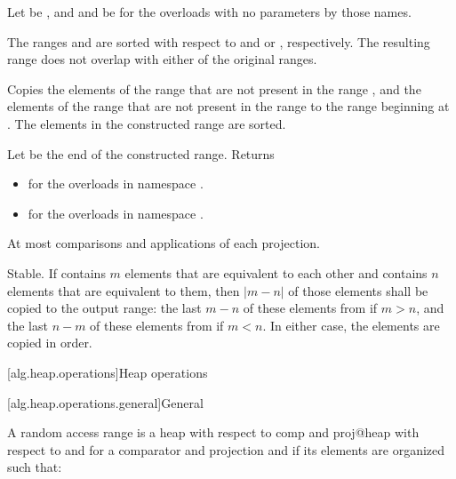 \begin{itemdescr}
\pnum
Let  be ,
and  and  be 
for the overloads with no parameters by those names.

\pnum
\expects
The ranges  and  are sorted
with respect to  and  or , respectively.
The resulting range does not overlap with either of the original ranges.

\pnum
\effects
Copies the elements of the range 
that are not present in the range ,
and the elements of the range 
that are not present in the range 
to the range beginning at .
The elements in the constructed range are sorted.

\pnum
\returns
Let  be the end of the constructed range.
Returns
\begin{itemize}
\item
  for the overloads in namespace .
\item
  for the overloads in namespace .
\end{itemize}

\pnum
\complexity
At most 
comparisons and applications of each projection.

\pnum
\remarks
Stable.
If  contains $m$ elements
that are equivalent to each other and
 contains $n$ elements
that are equivalent to them,
then $|m - n|$ of those elements shall be copied to the output range:
the last $m - n$ of these elements from  if $m > n$, and
the last $n - m$ of these elements from  if $m < n$.
In either case, the elements are copied in order.
\end{itemdescr}

[alg.heap.operations]{Heap operations}

[alg.heap.operations.general]{General}

\pnum
A random access range  is a
{heap with respect to comp and proj@heap with respect to  and }
for a comparator and projection  and 
if its elements are organized such that:

